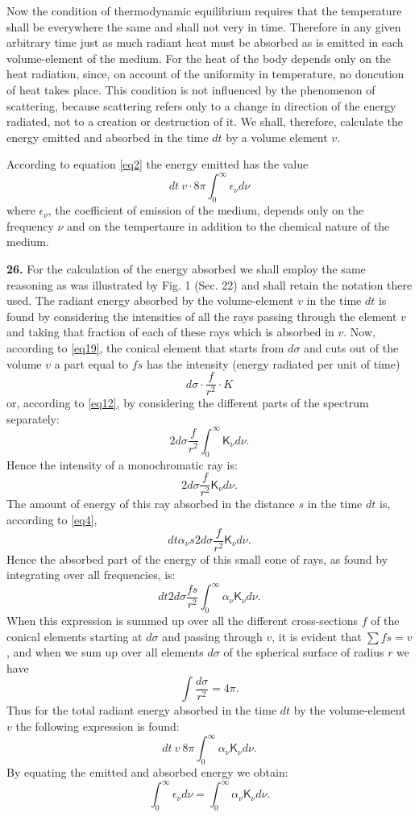 \documentclass[12pt,oneside]{book}
\begin{document}
Now the condition of thermodynamic equilibrium requires that the temperature shall be everywhere the same and shall not very in time. Therefore in any given arbitrary time just as much radiant heat must be absorbed as is emitted in each volume-element of the medium. For the heat of the body depends only on the heat radiation, since, on account of the uniformity in temperature, no doncution of heat takes place. This condition is not influenced by the phenomenon of scattering, because scattering refers only to a change in direction of the energy radiated, not to a creation or destruction of it. We shall, therefore, calculate the energy emitted and absorbed in the time $dt$ by a volume element $v$. \par

According to equation \eqref{eq2} the energy emitted has the value
$$dt\ v\cdot 8\pi\int_0^\infty \epsilon_\nu d\nu$$
where $\epsilon_\nu$, the coefficient of emission of the medium, depends only on the frequency $\nu$ and on the tempertaure in addition to the chemical nature of the medium. \par

\textbf{26.} For the calculation of the energy absorbed we shall employ the same reasoning as was illustrated by Fig. 1 (Sec. 22) and shall retain the notation there used. The radiant energy absorbed by the volume-element $v$ in the time $dt$ is found by considering the intensities of all the rays passing through the element $v$ and taking that fraction of each of these rays which is absorbed in $v$. Now, according to \eqref{eq19}, the conical element that starts from $d\sigma$ and cuts out of the volume $v$ a part equal to $fs$ has the intensity (energy radiated per unit of time)
$$d\sigma\cdot\frac{f}{r^2}\cdot K$$
or, according to \eqref{eq12}, by considering the different parts of the spectrum separately:
$$2d\sigma\frac{f}{r^2}\int_0^\infty \mathsf{K}_\nu d\nu.$$
Hence the intensity of a monochromatic ray is:
$$2d\sigma\frac{f}{r^2}\mathsf{K}_\nu d\nu.$$
The amount of energy of this ray absorbed in the distance $s$ in the time $dt$ is, according to \eqref{eq4},
$$dt\alpha_\nu s2d\sigma\frac{f}{r^2}\mathsf{K}_\nu d\nu.$$
Hence the absorbed part of the energy of this small cone of rays, as found by integrating over all frequencies, is:
$$dt2d\sigma\frac{fs}{r^2}\int_0^\infty\alpha_\nu\mathsf{K}_\nu d\nu.$$
When this expression is summed up over all the different cross-sections $f$ of the conical elements starting at $d\sigma$ and passing through $v$, it is evident that $\sum fs=v$, and when we sum up over all elements $d\sigma$ of the spherical surface of radius $r$ we have
$$\int\frac{d\sigma}{r^2}=4\pi.$$
Thus for the total radiant energy absorbed in the time $dt$ by the volume-element $v$ the following expression is found:
\begin{equation}
    dt\ v\ 8\pi\int_0^\infty \alpha_\nu\mathsf{K}_\nu d\nu.
    \label{eq25}
\end{equation}
By equating the emitted and absorbed energy we obtain:
\begin{equation*}
    \int_0^\infty \epsilon_\nu d\nu=\int_0^\infty \alpha_\nu\mathsf{K}_\nu d\nu.
\end{equation*} \par
\end{document}
